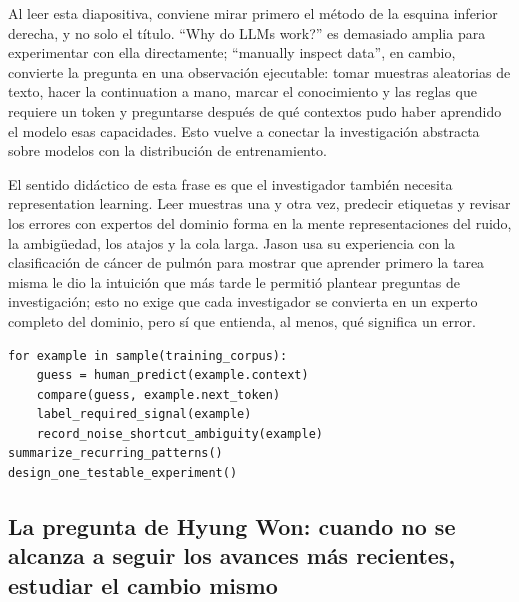 
Al leer esta diapositiva, conviene mirar primero el método de la esquina inferior derecha, y no solo el título. ``Why do LLMs work?'' es demasiado amplia para experimentar con ella directamente; ``manually inspect data'', en cambio, convierte la pregunta en una observación ejecutable: tomar muestras aleatorias de texto, hacer la continuation a mano, marcar el conocimiento y las reglas que requiere un token y preguntarse después de qué contextos pudo haber aprendido el modelo esas capacidades. Esto vuelve a conectar la investigación abstracta sobre modelos con la distribución de entrenamiento.



El sentido didáctico de esta frase es que el investigador también necesita representation learning. Leer muestras una y otra vez, predecir etiquetas y revisar los errores con expertos del dominio forma en la mente representaciones del ruido, la ambigüedad, los atajos y la cola larga. Jason usa su experiencia con la clasificación de cáncer de pulmón para mostrar que aprender primero la tarea misma le dio la intuición que más tarde le permitió plantear preguntas de investigación; esto no exige que cada investigador se convierta en un experto completo del dominio, pero sí que entienda, al menos, qué significa un error.

\begin{lstlisting}[caption={Ciclo mínimo de investigación de la manual data inspection}]
for example in sample(training_corpus):
    guess = human_predict(example.context)
    compare(guess, example.next_token)
    label_required_signal(example)
    record_noise_shortcut_ambiguity(example)
summarize_recurring_patterns()
design_one_testable_experiment()
\end{lstlisting}

\subsection{La pregunta de Hyung Won: cuando no se alcanza a seguir los avances más recientes, estudiar el cambio mismo}

